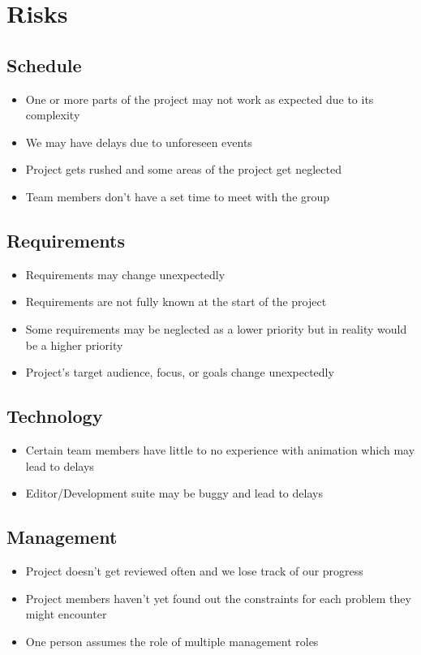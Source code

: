 \documentclass[12pt]{article}
\begin{document}
\section{Risks}
\label{sec:risks}
\subsection{Schedule}
\begin{itemize}
 \item One or more parts of the project may not work as expected due to its complexity
 \item We may have delays due to unforeseen events
 \item Project gets rushed and some areas of the project get neglected
 \item Team members don’t have a set time to meet with the group
\end{itemize}

\subsection{Requirements}
\begin{itemize}
 \item Requirements may change unexpectedly
 \item Requirements are not fully known at the start of the project
 \item Some requirements may be neglected as a lower priority but in reality would be a higher priority
 \item Project’s target audience, focus, or goals change unexpectedly
\end{itemize}

\subsection{Technology}
\begin{itemize}
 \item Certain team members have little to no experience with animation which may lead to delays
 \item Editor/Development suite may be buggy and lead to delays
\end{itemize}

\subsection{Management}
\begin{itemize}
 \item Project doesn’t get reviewed often and we lose track of our progress
 \item Project members haven’t yet found out the constraints for each problem they might encounter
 \item One person assumes the role of multiple management roles
\end{itemize}
\end{document}

